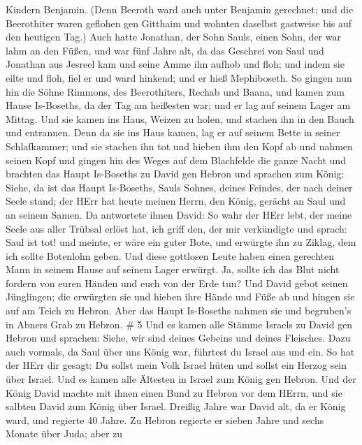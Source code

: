 Kindern Benjamin. (Denn Beeroth ward auch unter Benjamin gerechnet;
 und die Beerothiter waren geflohen gen Gitthaim und wohnten
daselbst gastweise bis auf den heutigen Tag.)  Auch hatte
Jonathan, der Sohn Sauls, einen Sohn, der war lahm an den Füßen, und war
fünf Jahre alt, da das Geschrei von Saul und Jonathan aus Jesreel kam
und seine Amme ihn aufhob und floh; und indem sie eilte und floh, fiel
er und ward hinkend; und er hieß Mephiboseth.  So gingen nun
hin die Söhne Rimmons, des Beerothiters, Rechab und Baana, und kamen zum
Hause Is-Boseths, da der Tag am heißesten war; und er lag auf seinem
Lager am Mittag.  Und sie kamen ins Haus, Weizen zu holen,
und stachen ihn in den Bauch und entrannen.  Denn da sie ins
Haus kamen, lag er auf seinem Bette in seiner Schlafkammer; und sie
stachen ihn tot und hieben ihm den Kopf ab und nahmen seinen Kopf und
gingen hin des Weges auf dem Blachfelde die ganze Nacht  und
brachten das Haupt Is-Boseths zu David gen Hebron und sprachen zum
König: Siehe, da ist das Haupt Is-Boseths, Sauls Sohnes, deines Feindes,
der nach deiner Seele stand; der HErr hat heute meinen Herrn, den König,
gerächt an Saul und an seinem Samen.  Da antwortete ihnen
David: So wahr der HErr lebt, der meine Seele aus aller Trübsal erlöst
hat,  ich griff den, der mir verkündigte und sprach: Saul
ist tot! und meinte, er wäre ein guter Bote, und erwürgte ihn zu Ziklag,
dem ich sollte Botenlohn geben.  Und diese gottlosen Leute
haben einen gerechten Mann in seinem Hause auf seinem Lager erwürgt. Ja,
sollte ich das Blut nicht fordern von euren Händen und euch von der Erde
tun?  Und David gebot seinen Jünglingen; die erwürgten sie
und hieben ihre Hände und Füße ab und hingen sie auf am Teich zu Hebron.
Aber das Haupt Is-Boseths nahmen sie und begruben's in Abners Grab zu
Hebron. \# 5  Und es kamen alle Stämme Israels zu David gen
Hebron und sprachen: Siehe, wir sind deines Gebeins und deines
Fleisches.  Dazu auch vormals, da Saul über uns König war,
führtest du Israel aus und ein. So hat der HErr dir gesagt: Du sollst
mein Volk Israel hüten und sollst ein Herzog sein über Israel.
 Und es kamen alle Ältesten in Israel zum König gen Hebron.
Und der König David machte mit ihnen einen Bund zu Hebron vor dem HErrn,
und sie salbten David zum König über Israel.  Dreißig Jahre
war David alt, da er König ward, und regierte 40 Jahre.  Zu
Hebron regierte er sieben Jahre und sechs Monate über Juda; aber zu
